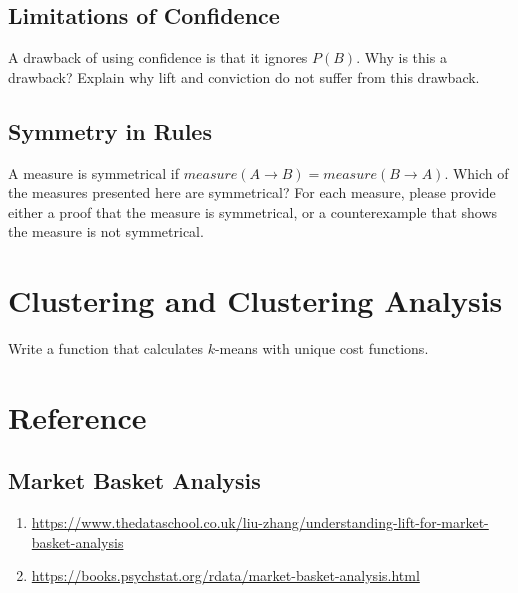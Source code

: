 \documentclass[paper=a4, fontsize=11pt]{scrartcl} %
\numberwithin{equation}{section} %
\numberwithin{figure}{section} %
\numberwithin{table}{section} %
\begin{document}
\subsection{Limitations of Confidence}
A drawback of using confidence is that it ignores $P(B)$. Why is this a drawback? Explain why lift and conviction do not suffer from this drawback. 

\subsection{Symmetry in Rules}
A measure is symmetrical if $measure(A \rightarrow B) = measure(B \rightarrow A)$. Which of the measures presented here are symmetrical? For each measure, please provide either a proof that the measure is symmetrical, or a counterexample that shows the measure is not symmetrical. 

\section{Clustering and Clustering Analysis}

Write a function that calculates $k$-means with unique cost functions.
    

\section{Reference}

\subsection{Market Basket Analysis}
\begin{enumerate}
    \item \url{https://www.thedataschool.co.uk/liu-zhang/understanding-lift-for-market-basket-analysis}
    \item \url{https://books.psychstat.org/rdata/market-basket-analysis.html}
\end{enumerate}
\end{document}
